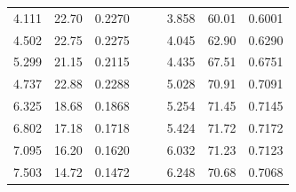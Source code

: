 \documentclass[12pt,a4paper]{article}
\begin{document}
\begin{enumerate}
\begin{table}[h!]
\begin{tabular}{ccccc|lll|}
				\multicolumn{1}{|c|}{4.111}                     & \multicolumn{1}{c|}{22.70}                     & \multicolumn{1}{c|}{0.2270}     &  &  & \multicolumn{1}{l|}{3.858}                     & \multicolumn{1}{l|}{60.01}                    & 0.6001                         \\ \cline{1-3} \cline{6-8} 
				\multicolumn{1}{|c|}{4.502}                     & \multicolumn{1}{c|}{22.75}                    & \multicolumn{1}{c|}{0.2275}    &  &  & \multicolumn{1}{l|}{4.045}                     & \multicolumn{1}{l|}{62.90}                     & 0.6290                          \\ \cline{1-3} \cline{6-8} 
				\multicolumn{1}{|c|}{5.299}                     & \multicolumn{1}{c|}{21.15}                    & \multicolumn{1}{c|}{0.2115}    &  &  & \multicolumn{1}{l|}{4.435}                     & \multicolumn{1}{l|}{67.51}                    & 0.6751                         \\ \cline{1-3} \cline{6-8} 
				\multicolumn{1}{|c|}{4.737}                     & \multicolumn{1}{c|}{22.88}                    & \multicolumn{1}{c|}{0.2288}    &  &  & \multicolumn{1}{l|}{5.028}                     & \multicolumn{1}{l|}{70.91}                    & 0.7091                         \\ \cline{1-3} \cline{6-8} 
				\multicolumn{1}{|c|}{6.325}                     & \multicolumn{1}{c|}{18.68}                    & \multicolumn{1}{c|}{0.1868}    &  &  & \multicolumn{1}{l|}{5.254}                     & \multicolumn{1}{l|}{71.45}                    & 0.7145                         \\ \cline{1-3} \cline{6-8} 
				\multicolumn{1}{|c|}{6.802}                     & \multicolumn{1}{c|}{17.18}                    & \multicolumn{1}{c|}{0.1718}    &  &  & \multicolumn{1}{l|}{5.424}                     & \multicolumn{1}{l|}{71.72}                    & 0.7172                         \\ \cline{1-3} \cline{6-8} 
				\multicolumn{1}{|c|}{7.095}                     & \multicolumn{1}{c|}{16.20}                     & \multicolumn{1}{c|}{0.1620}     &  &  & \multicolumn{1}{l|}{6.032}                     & \multicolumn{1}{l|}{71.23}                    & 0.7123                         \\ \cline{1-3} \cline{6-8} 
				\multicolumn{1}{|c|}{7.503}                     & \multicolumn{1}{c|}{14.72}                    & \multicolumn{1}{c|}{0.1472}    &  &  & \multicolumn{1}{l|}{6.248}                     & \multicolumn{1}{l|}{70.68}                    & 0.7068                         \\ \cline{1-3} \cline{6-8} 

\end{tabular}
\end{table}
\end{enumerate}
\end{document}
